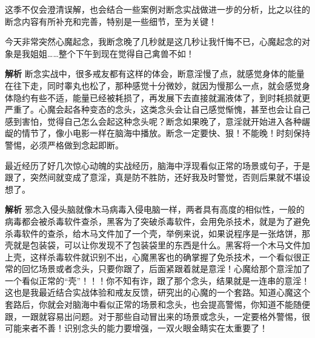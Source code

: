 这季不仅会澄清误解，也会结合一些案例对断念实战做进一步的分析，比之以往的断念内容有所补充和完善，特别是一些细节，至为关键！

\begin{case}[断念不能晚]
    今天非常突然心魔起念，我断念晚了几秒就是这几秒让我忏悔不已，心魔起念的对象是我姐姐……整个下午到现在觉得自己禽兽不如！

    \textbf{解析} 断念实战中，很多戒友都有这样的体会，断意淫慢了点，就感觉身体的能量在往下走，同时睾丸也松了，那种感觉十分微妙，就因为慢那么一点，就会感觉身体隐约有些不适，能量已经被耗损了，再发展下去直接就漏液体了，到时耗损就更严重了。心魔会起各种变态的念头，这类念头会让自己感觉惭愧，甚至也会让自己感到害怕，觉得自己怎么会起这种念头呢？断念如果晚了，意淫就开始进入各种龌龊的情节了，像小电影一样在脑海中播放。断念一定要快、狠！不能晚！时刻保持警惕，必须严格做到念起即断。
\end{case}

\begin{case}[加过壳的念头]
    最近经历了好几次惊心动魄的实战经历，脑海中浮现看似正常的场景或句子，于是跟了，突然间就变成了意淫，真是防不胜防，还好我及时警觉，否则后果就不堪设想了。

    \textbf{解析} 邪念入侵头脑就像木马病毒入侵电脑一样，两者具有高度的相似性，一般的病毒都会被杀毒软件查杀，黑客为了突破杀毒软件，会用免杀技术，就是为了避免杀毒软件的查杀，给木马文件加了一个壳，举例来说，如果说程序是一张烙饼，那壳就是包装袋，可以让你发现不了包装袋里的东西是什么。黑客将一个木马文件加上壳，这样杀毒软件就识别不出，心魔黑客也的确掌握了免杀技术，一个看似很正常的回忆场景或者念头，只要你跟了，后面紧跟着就是意淫！心魔给那个意淫加了一个看似正常的“壳”！！！你不知有诈，跟了那个念头，结果就是一连串的意淫！这也是我最近结合实战体验和戒友反馈，研究出的心魔的一个套路。知道心魔这个套路后，你就会对脑海中看似正常的场景和念头，也会提高警惕，你知道不能随便跟，一跟就容易出问题。对于那些自动冒出来的场景或念头，一定要格外警惕，很可能来者不善！识别念头的能力要增强，一双火眼金睛实在太重要了！
\end{case}

